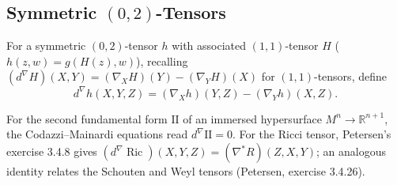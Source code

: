 \subsection{Symmetric $(0,2)$-Tensors}

\begin{definition}
  \label{def:pet-ch9-codazzi-exterior-derivative}
  For a symmetric $(0,2)$-tensor $h$ with associated $(1,1)$-tensor $H$
  ($h(z,w)=g(H(z),w)$), recalling $(d^\nabla H)(X,Y)=(\nabla_XH)(Y)-(\nabla_YH)(X)$
  for $(1,1)$-tensors, define
  \[
    d^\nabla h(X,Y,Z)=(\nabla_Xh)(Y,Z)-(\nabla_Yh)(X,Z).
  \]
\end{definition}

\begin{remark}
  \label{rem:pet-ch9-ricci-codazzi-identity}
  For the second fundamental form $\mathrm{II}$ of an immersed hypersurface
  $M^n\to\mathbb{R}^{n+1}$, the Codazzi--Mainardi equations read $d^\nabla\mathrm{II}=0$.
  For the Ricci tensor, Petersen's exercise 3.4.8 gives
  $(d^\nabla\operatorname{Ric})(X,Y,Z)=(\nabla^*R)(Z,X,Y)$; an analogous identity relates
  the Schouten and Weyl tensors (Petersen, exercise 3.4.26).
\end{remark}

